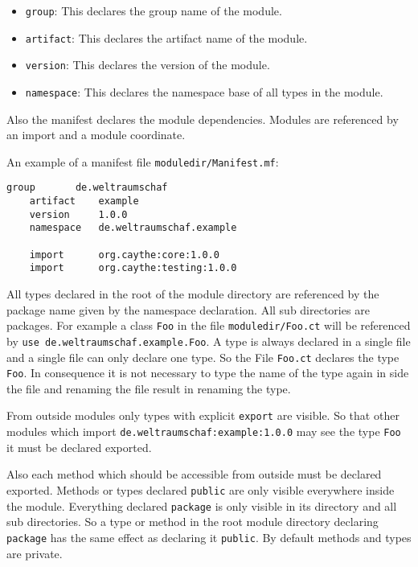 \documentclass[11pt,a4paper]{report}
\begin{document}
\begin{itemize}
    \item \texttt{group}: This declares the group name of the module.
    \item \texttt{artifact}: This declares the artifact name of the module.
    \item \texttt{version}: This declares the version of the module.
    \item \texttt{namespace}: This declares the namespace base of all types in the module.
\end{itemize}

Also the manifest declares the module dependencies. Modules are referenced by an import and a module coordinate.

An example of a manifest file \texttt{moduledir/Manifest.mf}:
\begin{lstlisting}[language=CayThe]
    group       de.weltraumschaf
    artifact    example
    version     1.0.0
    namespace   de.weltraumschaf.example

    import      org.caythe:core:1.0.0
    import      org.caythe:testing:1.0.0
\end{lstlisting}

All types declared in the root of the module directory are referenced by the package name given by the namespace declaration. All sub directories are packages. For example a class \texttt{Foo} in the file \texttt{moduledir/Foo.ct} will be referenced by \texttt{use de.weltraumschaf.example.Foo}. A type is always declared in a single file and a single file can only declare one type. So the File \texttt{Foo.ct} declares the type \texttt{Foo}. In consequence it is not necessary to type the name of the type again in side the file and renaming the file result in renaming the type.

From outside modules only types with explicit \texttt{export} are visible. So that other modules which import \texttt{de.weltraumschaf:example:1.0.0} may see the type \texttt{Foo} it must be declared exported.

Also each method which should be accessible from outside must be declared exported. Methods or types declared \texttt{public} are only visible everywhere inside the module. Everything declared \texttt{package} is only visible in its directory and all sub directories. So a type or method in the root module directory declaring \texttt{package} has the same effect as declaring it \texttt{public}. By default methods and types are private.
\end{document}
